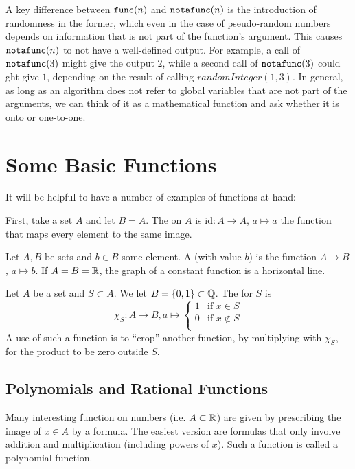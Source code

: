 A key difference between $\mbox{\texttt{func}}(n)$ and
$\mbox{\texttt{notafunc}}(n)$ is the introduction of randomness
in the
former, which even in the case of pseudo-random numbers depends on
information that is not part of the function's argument.
This causes $\mbox{\texttt{notafunc}}(n)$ to not have a well-defined
output. For example, a call of $\mbox{\texttt{notafunc}}(3)$ might give the
output $2$, while a second call of $\mbox{\texttt{notafunc}}(3)$ could ght
give $1$,
depending on the result of calling $randomInteger(1,3)$. In
general, as long as an algorithm does not refer to global variables that are not
part of the arguments, we can
think of it as a mathematical function and ask whether it is onto or
one-to-one.

\section{Some Basic Functions}

It will be helpful to have a number of examples of functions at hand:
\medskip

First, take a set $A$ and let $B=A$. The  on $A$ is
$\mbox{id}\colon A\to A$, $a\mapsto a$ the function that maps every element to the same
image.

\medskip
Let $A,B$ be sets and $b\in B$ some element. A 
(with value $b$) is the function $A\to B$, $a\mapsto b$. If $A=B={\mathbb R}$, the
graph of a constant function is a horizontal line.
\medskip

Let $A$ be a set and $S\subset A$. We let $B=\{0,1\}\subset {\mathbb Q}$. The
 for $S$ is
\[
\chi_S\colon A\to B, a\mapsto\left\{\begin{array}{cl}
1&\mbox{if $x\in S$}\\
0&\mbox{if $x\not\in S$}\\
\end{array}
\right.
\]
A use of such a function is to ``crop'' another function, by multiplying with $\chi_S$,
for the product to be zero outside $S$.

\subsection{Polynomials and Rational Functions}

Many interesting function on numbers (i.e. $A\subset{\mathbb R}$) are given by
prescribing the image of $x\in A$ by a formula. The easiest version are
formulas that only involve addition and multiplication (including powers of
$x$). Such a function is called a polynomial function.

